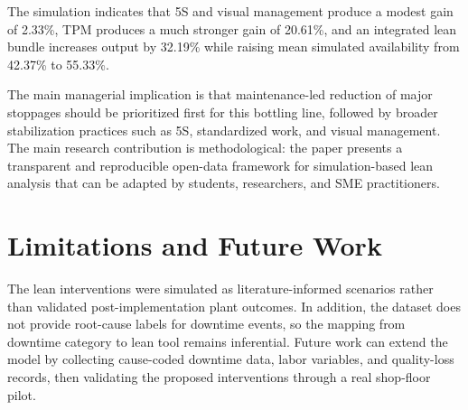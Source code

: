 \documentclass[journal]{IEEEtran}
\begin{document}
The simulation indicates that 5S and visual management produce a modest gain of 2.33\%, TPM produces a much stronger gain of 20.61\%, and an integrated lean bundle increases output by 32.19\% while raising mean simulated availability from 42.37\% to 55.33\%.

The main managerial implication is that maintenance-led reduction of major stoppages should be prioritized first for this bottling line, followed by broader stabilization practices such as 5S, standardized work, and visual management. The main research contribution is methodological: the paper presents a transparent and reproducible open-data framework for simulation-based lean analysis that can be adapted by students, researchers, and SME practitioners.

\section*{Limitations and Future Work}
The lean interventions were simulated as literature-informed scenarios rather than validated post-implementation plant outcomes. In addition, the dataset does not provide root-cause labels for downtime events, so the mapping from downtime category to lean tool remains inferential. Future work can extend the model by collecting cause-coded downtime data, labor variables, and quality-loss records, then validating the proposed interventions through a real shop-floor pilot.



\end{document}
